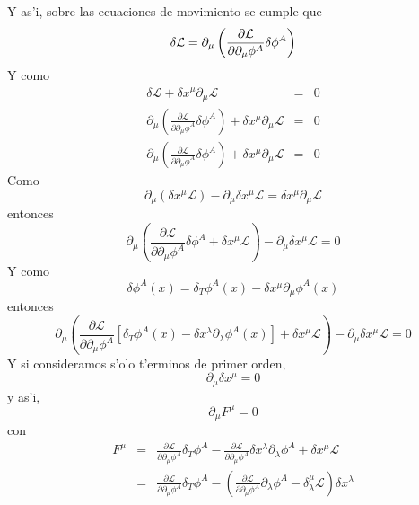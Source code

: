 Y as'i, sobre las ecuaciones de movimiento se cumple que
\begin{equation}
\delta \mathcal{L}=\partial _{\mu }\left( \frac{\partial \mathcal{L}}{%
\partial \partial _{\mu }\phi ^{A}}\delta \phi ^{A}\right) 
\end{equation}
Y como
\begin{eqnarray*}
\delta \mathcal{L}+\delta x^{\mu }\partial _{\mu }\mathcal{L} &=&0 \\
\partial _{\mu }\left( \frac{\partial \mathcal{L}}{\partial \partial _{\mu
}\phi ^{A}}\delta \phi ^{A}\right) +\delta x^{\mu }\partial _{\mu }\mathcal{L%
} &=&0 \\
\partial _{\mu }\left( \frac{\partial \mathcal{L}}{\partial \partial _{\mu
}\phi ^{A}}\delta \phi ^{A}\right) +\delta x^{\mu }\partial _{\mu }\mathcal{L%
} &=&0
\end{eqnarray*}
Como
\begin{equation}
\partial _{\mu }\left( \delta x^{\mu }\mathcal{L}\right) -\partial _{\mu
}\delta x^{\mu }\mathcal{L}=\delta x^{\mu }\partial _{\mu }\mathcal{L}
\end{equation}
entonces
\begin{equation}
\partial _{\mu }\left( \frac{\partial \mathcal{L}}{\partial \partial _{\mu
}\phi ^{A}}\delta \phi ^{A}+\delta x^{\mu }\mathcal{L}\right) -\partial
_{\mu }\delta x^{\mu }\mathcal{L}=0
\end{equation}
Y como
\begin{equation}
\delta \phi ^{A}(x) =\delta _{T}\phi ^{A}(x) -\delta
x^{\mu }\partial _{\mu }\phi ^{A}(x) 
\end{equation}
entonces
\begin{equation}
\partial _{\mu }\left( \frac{\partial \mathcal{L}}{\partial \partial _{\mu
}\phi ^{A}}\left[ \delta _{T}\phi ^{A}(x) -\delta x^{\lambda
}\partial _{\lambda }\phi ^{A}(x) \right] +\delta x^{\mu }%
\mathcal{L}\right) -\partial _{\mu }\delta x^{\mu }\mathcal{L}=0
\end{equation}
Y si consideramos s'olo t'erminos de primer orden,
\begin{equation}
\partial _{\mu }\delta x^{\mu }=0
\end{equation}
y as'i,
\begin{equation}
\partial _{\mu }F^{\mu }=0
\end{equation}
con
\begin{eqnarray*}
F^{\mu } &=&\frac{\partial \mathcal{L}}{\partial \partial _{\mu }\phi ^{A}}%
\delta _{T}\phi ^{A}-\frac{\partial \mathcal{L}}{\partial \partial _{\mu
}\phi ^{A}}\delta x^{\lambda }\partial _{\lambda }\phi ^{A}+\delta x^{\mu }%
\mathcal{L} \\
&=&\frac{\partial \mathcal{L}}{\partial \partial _{\mu }\phi ^{A}}\delta
_{T}\phi ^{A}-\left( \frac{\partial \mathcal{L}}{\partial \partial _{\mu
}\phi ^{A}}\partial _{\lambda }\phi ^{A}-\delta _{\lambda }^{\mu }\mathcal{L}%
\right) \delta x^{\lambda }
\end{eqnarray*}
